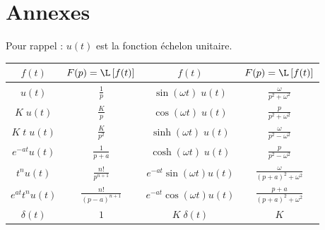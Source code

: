 \section{Annexes}


Pour rappel : $u(t)$ est la fonction échelon unitaire.
\renewcommand\arraystretch{1.3}
\begin{center}
\begin{tabular}{|c|c||c|c|}
	\hline
	$f(t)$			&		$\displaystyle F(p)=\L\left[f(t)\right]$		&	$f(t)$				&	$F(p)=\L\left[f(t)\right]$			\\[0.3cm]
	\hline\hline
	$u(t)$			&		$\displaystyle \frac 1p$				&	$\sin(\omega t)\;u(t)$		&	$\displaystyle \frac{\omega}{p^2+\omega^2}$	\\[0.3cm]
	\hline
	$K\;u(t)$		&		$\displaystyle \frac{K}{p}$				&	$\cos(\omega t)\;u(t)$		&	$\displaystyle \frac{p}{p^2+\omega^2}$		\\[0.3cm]
	\hline
	$K\;t\;u(t)$		&		$\displaystyle \frac K{p^2}$				&	$\sinh(\omega t)\;u(t)$		&	$\displaystyle \frac \omega{p^2-\omega^2}$	\\[0.3cm]
	\hline
	$e^{-at}u(t)$		&		$\displaystyle \frac{1}{p+a}$				&	$\cosh(\omega t)\;u(t)$		&	$\displaystyle \frac{p}{p^2-\omega^2}$		\\[0.3cm]
	\hline
	$t^nu(t)$		&		$\displaystyle \frac{n!}{p^{n+1}}$			&	$e^{-at}\sin(\omega t)u(t)$	&	$\displaystyle \frac \omega{(p+a)^2+\omega^2}$	\\[0.3cm]
	\hline
	$e^{at} t^n u(t)$	&		$\displaystyle \frac{n!}{(p-a)^{n+1}}$			&	$e^{-at}\cos(\omega t) u(t)$	&	$\displaystyle \frac{p+a}{(p+a)^2+\omega^2}$	\\[0.3cm]
	\hline
	$\delta(t)$		&		$1$							&	$K\;\delta(t)$			&	$K$						\\[0.3cm]
	\hline
\end{tabular}
\end{center}
